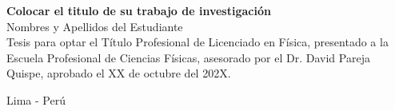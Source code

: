 \begin{titlepage}
    \vspace{1.0cm}
    {\large \bfseries Colocar el titulo de su trabajo de investigación}\\
    \vspace{1.5cm}
    {\normalsize \mdseries Nombres y Apellidos del Estudiante \\
    } 
    \vspace{1.5cm}
    {\normalsize 
    Tesis para optar el Título Profesional de Licenciado en Física, presentado a la Escuela Profesional de Ciencias Físicas, asesorado por el Dr. David Pareja Quispe, aprobado el XX de octubre del 202X.}



    \center
    \vspace{4\baselineskip}
    {\large  Lima - Perú}\\
\medskip
    {\large \textbf{\the\year}} \\\vfill %
\end{titlepage}
